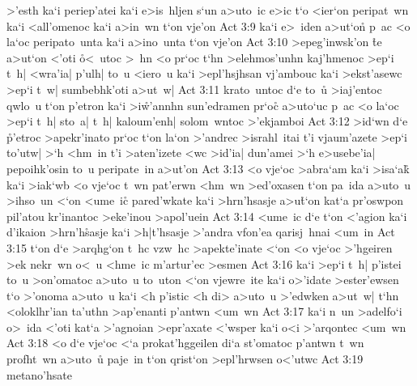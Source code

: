 >'esth
ka`i
periep'atei
ka`i
e>is~hljen
s`un
a>uto~ic
e>ic
t`o
<ier`on
peripat~wn
ka`i
<all'omenoc
ka`i
a>in~wn
t`on
vje'on\bibvsend
\vs Act 3:9
ka`i
e>~iden
a>ut`on\r{}
p~ac
<o
la`oc
peripato~unta
ka`i
a>ino~unta
t`on
vje'on\bibvsend
\vs Act 3:10
>epeg'inwsk'on
\r{t}e
a>ut`on
<'oti
\r{o}<~utoc
>~hn
<o
pr`oc
t`hn
>elehmos'unhn
kaj'hmenoc
>ep`i
t~h|
<wra'ia|
p'ulh|
to~u
<iero~u
ka`i
>epl'hsjhsan
vj'ambouc
ka`i
>ekst'asewc
>ep`i
t~w|
sumbebhk'oti
a>ut~w|\bibvsend
\vs Act 3:11
krato~untoc
d`e
to~u\r{}
>iaj'entoc
qwlo~u
t`on
p'etron
ka`i
>i\r{w}'annhn
sun'edramen
pr`oc\r{}
a>uto`uc
p~ac
<o
la`oc
>ep`i
t~h|
sto~a|
t~h|
kaloum'enh|
solom~wntoc
>'ekjamboi\bibvsend
\vs Act 3:12
>id`wn
d`e
\r{p}'etroc
>apekr'inato
pr`oc
t`on
la`on
>'andrec
>israhl~itai
t'i
vjaum'azete
>ep`i
to'utw|
>`h
<hm~in
t'i
>aten'izete
<wc
>id'ia|
dun'amei
>`h
e>usebe'ia|
pepoihk'osin
to~u
peripate~in
a>ut'on\bibvsend
\vs Act 3:13
<o
vje`oc
>abra`am
ka`i
>isa`ak\r{}
ka`i
>iak`wb
<o
vje`oc
t~wn
pat'erwn
<hm~wn
>ed'oxasen
t`on
pa~ida
a>uto~u
>ihso~un
<`on
<ume~i\r{c}
pared'wkate
ka`i
>hrn'hsasje
a>u\r{t}`on
kat`a
pr'oswpon
pil'atou
kr'inantoc
>eke'inou
>apol'uein\bibvsend
\vs Act 3:14
<ume~ic
d`e
t`on
<'agion
ka`i
d'ikaion
>hrn'h\r{s}asje
ka`i
>h|t'hsasje
>'andra
vfon'ea
qarisj~hnai
<um~in\bibvsend
\vs Act 3:15
t`on
d`e
>arqhg`on
t~hc
vzw~hc
>apekte'inate
<`on
<o
vje`oc
>'hgeiren
>ek
nekr~wn
o<~u
<hme~ic
m'artur'ec
>esmen\bibvsend
\vs Act 3:16
ka`i
>ep`i
t~h|
p'istei
to~u
>on'omatoc
a>uto~u
to~uton
<`on
vjewre~ite
ka`i
o>'idate
>ester'ewsen
t`o
>'onoma
a>uto~u
ka`i
<h
p'istic
<h
di>
a>uto~u
>'edwken
a>ut~w|
t`hn
<oloklhr'ian
ta'uthn
>ap'enanti
p'antwn
<um~wn\bibvsend
\vs Act 3:17
ka`i
n~un
>adelfo`i
o>~ida
<'oti
kat`a
>'agnoian
>epr'axate
<'wsper
ka`i
o<i
>'arqontec
<um~wn\bibvsend
\vs Act 3:18
<o
d`e
vje`oc
<`a
prokat'hggeilen
di`a
st'omatoc
p'antwn
t~wn
profht~wn
a>uto~u\r{}
paje~in
t`on
qrist`on
>epl'hrwsen
o<'utwc\bibvsend
\vs Act 3:19
metano'hsate
